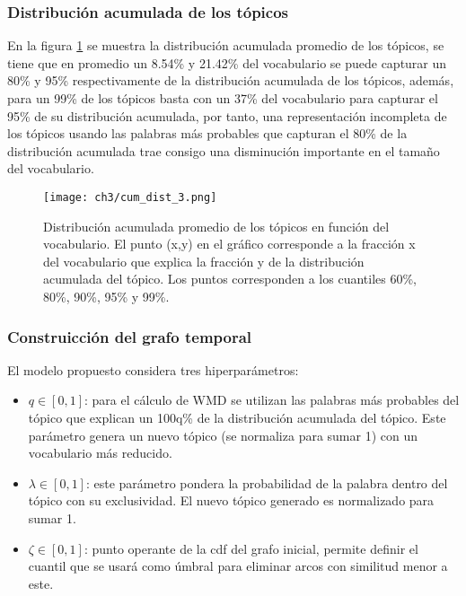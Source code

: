 \documentclass[letterpaper,12pt,oneside]{book} %
\begin{document}
\subsubsection{Distribución acumulada de los tópicos}
En la figura \ref{img:cum_dist3} se muestra la distribución acumulada promedio de los tópicos, se tiene que en promedio un 8.54\% y 21.42\% del vocabulario se puede capturar un 80\% y 95\% respectivamente de la distribución acumulada de los tópicos, además, para un 99\% de los tópicos basta con un 37\% del vocabulario para capturar el 95\% de su distribución acumulada, por tanto, una representación incompleta de los tópicos usando las palabras más probables que capturan el 80\% de la distribución acumulada trae consigo una disminución importante en el tamaño del vocabulario. 


\begin{figure}
    \centering
    \texttt{[image: ch3/cum\_dist\_3.png]}
    \caption{Distribución acumulada promedio de los tópicos en función del vocabulario. El punto (x,y) en el gráfico corresponde a la fracción x del vocabulario que explica la fracción y de la distribución acumulada del tópico. Los puntos corresponden a los cuantiles 60\%, 80\%, 90\%, 95\% y 99\%.}
    \label{img:cum_dist3}
\end{figure}

\subsubsection{Construicción del grafo temporal}

El modelo propuesto considera tres hiperparámetros:
\begin{itemize}
    \item $q \in [0,1]$: para el cálculo de WMD se utilizan las palabras más probables del tópico que explican un 100q\% de la distribución acumulada del tópico. Este parámetro genera un nuevo tópico (se normaliza para sumar 1) con un vocabulario más reducido.
    \item $\lambda \in [0,1]$: este parámetro pondera la probabilidad de la palabra dentro del tópico con su exclusividad. El nuevo tópico generado es normalizado para sumar 1.
    \item $\zeta \in [0,1]$: punto operante de la cdf del grafo inicial, permite definir el cuantil que se usará como úmbral para eliminar arcos con similitud menor a este. 
\end{itemize}
\end{document}

